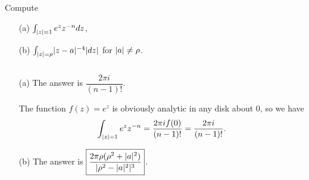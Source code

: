 \begin{exercise}
Compute
\begin{enumerate}
\item[(a)] $\int_{\lvert z \rvert=1}e^z z^{-n}dz$,
\item[(b)] $\int_{\lvert z \rvert=\rho} \lvert z-a \rvert^{-4}\lvert dz \rvert$ for $\lvert a \rvert \neq \rho$.
\end{enumerate}
\begin{sol}
$ $
\begin{enumerate}
\item[(a)] The answer is $\dfrac{2\pi i}{(n-1)!}$.

The function $f(z)=e^z$ is obviously analytic in any disk about $0$, so we have $$\int_{\lvert z \rvert=1}e^z z^{-n}=\dfrac{2\pi i f(0)}{(n-1)!}=\dfrac{2\pi i}{(n-1)!}.$$

\item[(b)] The answer is $\boxed{\dfrac{2\pi \rho (\rho^2+\lvert a \rvert^2)}{\lvert \rho^2-\lvert a \rvert^2 \rvert^3}}$.


\end{enumerate}
\end{sol}
\end{exercise}
